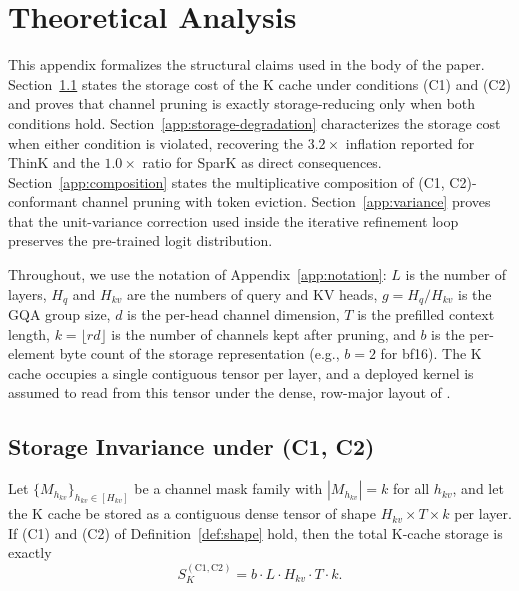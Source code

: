 \documentclass{article}
\begin{document}
 
\section{Theoretical Analysis}
\label{app:theory}
 
This appendix formalizes the structural claims used in the body of the paper. Section~\ref{app:storage-invariance} states the storage cost of the K cache under conditions (C1) and (C2) and proves that channel pruning is exactly storage-reducing only when both conditions hold. Section~\ref{app:storage-degradation} characterizes the storage cost when either condition is violated, recovering the $3.2\times$ inflation reported for ThinK and the $1.0\times$ ratio for SparK as direct consequences. Section~\ref{app:composition} states the multiplicative composition of (C1, C2)-conformant channel pruning with token eviction. Section~\ref{app:variance} proves that the unit-variance correction used inside the iterative refinement loop preserves the pre-trained logit distribution.
 
Throughout, we use the notation of Appendix~\ref{app:notation}: $L$ is the number of layers, $H_q$ and $H_{kv}$ are the numbers of query and KV heads, $g = H_q / H_{kv}$ is the GQA group size, $d$ is the per-head channel dimension, $T$ is the prefilled context length, $k = \lfloor rd \rfloor$ is the number of channels kept after pruning, and $b$ is the per-element byte count of the storage representation (e.g., $b = 2$ for bf16). The K cache occupies a single contiguous tensor per layer, and a deployed kernel is assumed to read from this tensor under the dense, row-major layout of \citet{trtllm}.
 
\subsection{Storage Invariance under (C1, C2)}
\label{app:storage-invariance}
 
\begin{theorem}
\label{thm:storage-invariance}
Let $\{M_{h_{kv}}\}_{h_{kv} \in [H_{kv}]}$ be a channel mask family with $|M_{h_{kv}}| = k$ for all $h_{kv}$, and let the K cache be stored as a contiguous dense tensor of shape $H_{kv} \times T \times k$ per layer. If (C1) and (C2) of Definition~\ref{def:shape} hold, then the total K-cache storage is exactly
\begin{equation}
S_K^{\mathrm{(C1, C2)}} = b \cdot L \cdot H_{kv} \cdot T \cdot k.
\label{eq:storage-invariance}
\end{equation}
\end{theorem}
 
\end{document}
